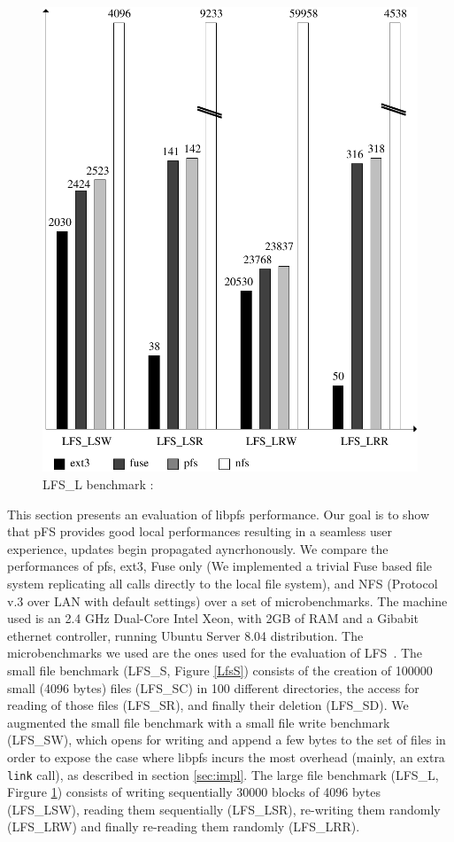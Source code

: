 \begin{figure}[ht]
\begin{center}
  \includegraphics [scale=0.55] {fig/lfs_l}
  \caption{\label{LfsL}
    {\small LFS\_L benchmark : }}
\end{center}
\end{figure}


This section presents an evaluation of libpfs performance. Our goal is
to show that pFS provides good local performances resulting in a
seamless user experience, updates begin propagated ayncrhonously. We
compare the performances of pfs, ext3, Fuse only (We implemented a
trivial Fuse based file system replicating all calls directly to the
local file system), and NFS (Protocol v.3 over LAN with default
settings) over a set of microbenchmarks. The machine used is an 2.4
GHz Dual-Core Intel Xeon, with 2GB of RAM and a Gibabit ethernet
controller, running Ubuntu Server 8.04 distribution. The
microbenchmarks we used are the ones used for the evaluation of
LFS~\cite{rosenblum:lfs}. The small file benchmark (LFS\_S, Figure
\ref{LfsS}) consists of the creation of 100000 small (4096 bytes)
files (LFS\_SC) in 100 different directories, the access for reading
of those files (LFS\_SR), and finally their deletion (LFS\_SD). We
augmented the small file benchmark with a small file write benchmark
(LFS\_SW), which opens for writing and append a few bytes to the set
of files in order to expose the case where libpfs incurs the most
overhead (mainly, an extra {\tt link} call), as described in section
\ref{sec:impl}. The large file benchmark (LFS\_L, Firgure \ref{LfsL})
consists of writing sequentially 30000 blocks of 4096 bytes
(LFS\_LSW), reading them sequentially (LFS\_LSR), re-writing them
randomly (LFS\_LRW) and finally re-reading them randomly (LFS\_LRR).




